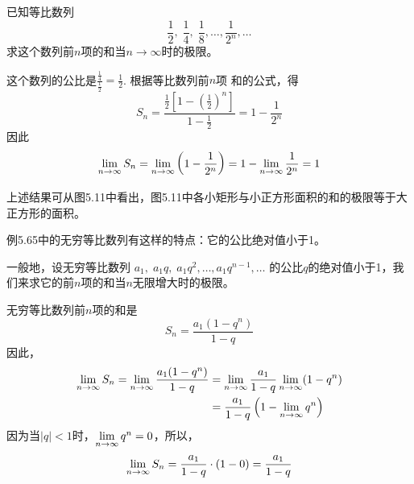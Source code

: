 \begin{example}
    已知等比数列$$\frac{1}{2},\;\frac{1}{4},\;\frac{1}{8},\ldots,\frac{1}{2^n},\ldots$$
    求这个数列前$n$项的和当$n\to\infty$时的极限。
\end{example}

\begin{solution}
    这个数列的公比是$\frac{\frac{1}{4}}{\frac{1}{2}}=\frac{1}{2}$. 根据等比数列前$n$项
    和的公式，得
\[S_n=\frac{\frac{1}{2}\left[1-\left(\frac{1}{2}\right)^n\right]}{1-\frac{1}{2}}=1-\frac{1}{2^n}\]
因此
\[\lim\limits_{n\to \infty}S_n=\lim\limits_{n\to \infty}\left(1-\dfrac{1}{2^n}\right)=1-\lim\limits_{n\to \infty}\dfrac{1}{2^n}=1\]

上述结果可从图5.11中看出，图5.11中各小矩形与小正方形面积的和的极限等于大正方形的面积。
\end{solution}

\begin{figure}[htp]
    \centering
{}
    \caption{}
\end{figure}



例5.65中的无穷等比数列有这样的特点：它的公比绝对值小于1。

一般地，设无穷等比数列
$a_1,\; a_1q,\; a_1q^2,\ldots,a_1q^{n-1},\ldots$
的公比$q$的绝对值小于1，我们来求它的前$n$项的和当$n$无限增大时的极限。

无穷等比数列前$n$项的和是
\[S_n=\frac{a_1(1-q^n)}{1-q}\]
因此，
\[\begin{split}
    \lim\limits_{n\to \infty}S_n=\lim\limits_{n\to \infty}\dfrac{a_1(1-q^n)}{1-q}&=\lim\limits_{n\to \infty}\dfrac{a_1}{1-q}\lim\limits_{n\to \infty}(1-q^n)\\
    &=\dfrac{a_1}{1-q}\left(1-\lim\limits_{n\to \infty}q^n\right)
\end{split}\]
因为当$|q|<1$时，$\lim\limits_{n\to \infty} q^n=0$，所以，
\[\lim\limits_{n\to \infty}S_n=\dfrac{a_1}{1-q}\cdot (1-0)=\dfrac{a_1}{1-q}\]

